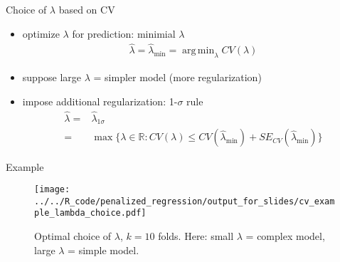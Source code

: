 \documentclass[xcolor=dvipsnames, handout]{beamer}
\DeclareMathOperator{\argmin}{arg\,min}
\begin{document}
\begin{frame}{Choice of $\lambda$ based on CV}
\begin{itemize}
  \item optimize $\lambda$ for prediction: minimial $\lambda$
\begin{align*}
  \hat{\lambda} = \hat{\lambda}_{\min} = \argmin_{\lambda} CV(\lambda)
\end{align*}
\pause 
\item suppose large $\lambda$ = simpler model (more regularization)
\item impose additional regularization: 1-$\sigma$ rule
\begin{align*}
  \hat{\lambda} = & \hat{\lambda}_{1\sigma} 
\\
  =&  \max \{\lambda \in \mathbb{R} : CV(\lambda) \leq CV(\hat{\lambda}_{\min}) +  SE_{CV}(\hat{\lambda}_{\min}) \}
\end{align*}
\end{itemize}
\end{frame}

\begin{frame}{Example}
  \begin{figure}
  \texttt{[image: ../../R\_code/penalized\_regression/output\_for\_slides/cv\_example\_lambda\_choice.pdf]}
   \caption{Optimal choice of $\lambda$, $k = 10$ folds. Here: small $\lambda$ = complex model, large $\lambda$ = simple model.}
\end{figure}
\end{frame}
\end{document}
